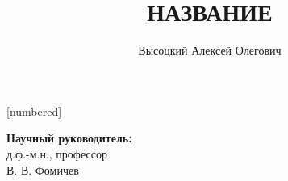 
[numbered]
\title[]{НАЗВАНИЕ}
\subtitle{}

\author[Высоцкий А.О.]{Высоцкий Алексей Олегович}


\date[ДАТА]{}

\setcounter{lecnum}{1}



\begin{frame}[t]
	\begin{titlepage}
		\begin{flushright}
			\small
			{\bf Научный руководитель:}\\
			д.ф.-м.н., профессор\\
			В. В. Фомичев
		\end{flushright}
	\end{titlepage}
\end{frame}

\begin{frame}
\end{frame}




